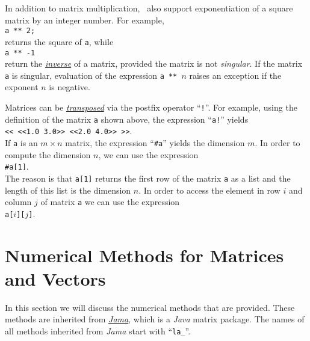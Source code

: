 In addition to matrix multiplication, \setlx\ also support exponentiation of a square matrix by an
integer number.  For example, 
\\[0.2cm]
\hspace*{1.3cm}
\texttt{a ** 2;}
\\[0.2cm]
returns the square  of \texttt{a}, while 
\\[0.2cm]
\hspace*{1.3cm}
\texttt{a ** -1}
\\[0.2cm]
return the \href{http://en.wikipedia.org/wiki/Invertible_matrix}{\emph{inverse}} of a matrix,
provided the matrix is not \emph{singular}.  If the matrix \texttt{a} is singular, evaluation of the
expression \texttt{a ** $n$} raises an exception if the exponent $n$ is negative.

Matrices can be \href{http://en.wikipedia.org/wiki/Transpose}{\emph{transposed}} via the postfix
operator ``\texttt{!}''.  For example, using the definition of the matrix \texttt{a} shown above,
the expression ``\texttt{a!}'' yields 
\\[0.2cm]
\hspace*{1.3cm}
\texttt{<< <<1.0 3.0>> <<2.0 4.0>> >>}.
\\[0.2cm]
If \texttt{a} is an $m \times n$ matrix, the expression ``\texttt{\#a}'' yields the dimension $m$.  
In order to compute the dimension $n$, we can use the expression 
\\[0.2cm]
\hspace*{1.3cm}
\texttt{\#a[1]}.
\\[0.2cm]
The reason is that \texttt{a[1]} returns the first row of the matrix \texttt{a} as a list and the
length of this list is the dimension $n$.  In order to access the element in row $i$ and column $j$
of matrix \texttt{a} we can use the expression
\\[0.2cm]
\hspace*{1.3cm}
\texttt{a[$i$][$j$]}.

\section{Numerical Methods for Matrices and Vectors}
In this section we will discuss the numerical methods that are provided.  These methods are inherited
from \href{http://math.nist.gov/javanumerics/jama/}{\textsl{Jama}}, which is a \textsl{Java} matrix
package.  The names of all methods inherited from \textsl{Jama} start with ``\texttt{la\_}''.

